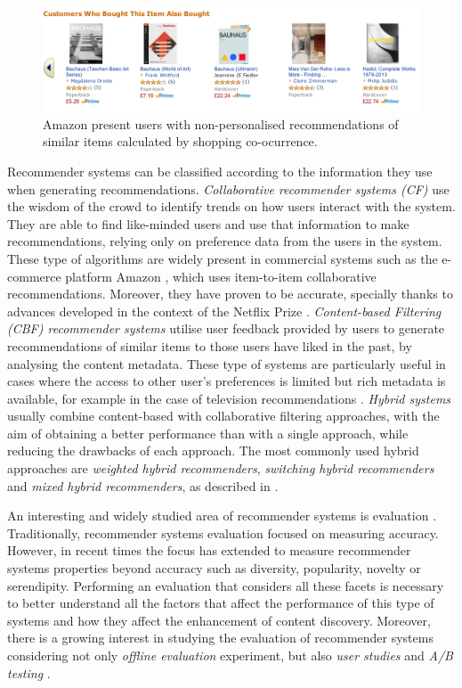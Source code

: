 \begin{figure}[h!] 
  \centering
    \includegraphics[width=1\textwidth]{figures/amazon1}
  \caption{Amazon present users with non-personalised recommendations of similar items calculated by shopping co-ocurrence.}
   \label{fig:amazon1}
\end{figure}


Recommender systems can be classified according to the information they use when generating recommendations. \emph{Collaborative recommender systems (CF)} \cite{Sarwara, Koren2008, Bell2007} use the wisdom of the crowd to identify trends on how users interact with the system. They are able to find like-minded users and use that information to make recommendations, relying only on preference data from the users in the system. These type of algorithms are widely present in commercial systems such as the e-commerce platform Amazon \cite{Linden2003}, which uses item-to-item collaborative recommendations. Moreover, they have proven to be accurate, specially thanks to advances developed in the context of the Netflix Prize \cite{Bennett2007}. \emph{Content-based Filtering (CBF) recommender systems} \cite{Meteren, Lops2011,  Pazzani2007}  utilise user feedback provided by users to generate recommendations of similar items to those users have liked in the past, by analysing the content metadata. These type of systems are particularly useful in cases where the access to other user's preferences is limited but rich metadata is available, for example in the case of television recommendations \cite{Blanco-Fernandez2008}. \emph{Hybrid systems} \cite{Modeling2002, Bostandjiev2012} usually combine content-based with collaborative filtering approaches, with the aim of obtaining a better performance than with a single approach, while reducing the drawbacks of each approach. The most commonly used hybrid approaches are \emph{weighted hybrid recommenders}, \emph{switching hybrid recommenders} and \emph{mixed hybrid recommenders}, as described in \cite{Modeling2002}.

An interesting and widely studied area of recommender systems is evaluation \cite{Herlocker2004, Shani}. Traditionally, recommender systems evaluation focused on measuring accuracy. However, in recent times the focus has extended to measure recommender systems properties  beyond accuracy \cite{Konstan2012, McNee2006a} such as diversity, popularity, novelty or serendipity. Performing an evaluation that considers all these facets is necessary to better understand all the factors that affect the performance of this type of systems and how they affect the enhancement of content discovery. Moreover, there is a growing interest in studying the evaluation of recommender systems considering not only \emph{offline evaluation} experiment, but also \emph{user studies} and \emph{A/B testing} \cite{Shani}.


